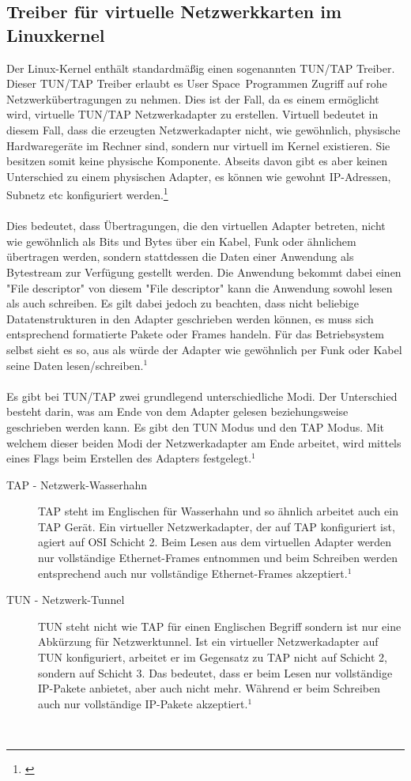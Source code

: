 \subsection{Treiber für virtuelle Netzwerkkarten im Linuxkernel}
Der Linux-Kernel enthält standardmäßig einen sogenannten TUN/TAP Treiber. Dieser TUN/TAP Treiber erlaubt es \dq User Space\dq \ Programmen Zugriff auf rohe Netzwerkübertragungen zu nehmen. Dies ist der Fall, da es einem ermöglicht wird, virtuelle TUN/TAP Netzwerkadapter zu erstellen.
Virtuell bedeutet in diesem Fall, dass die erzeugten Netzwerkadapter nicht, wie gewöhnlich, physische Hardwaregeräte im Rechner sind, sondern nur virtuell im Kernel existieren. Sie besitzen somit keine physische Komponente. Abseits davon gibt es aber keinen Unterschied zu einem physischen Adapter, es können wie gewohnt IP-Adressen, Subnetz etc konfiguriert werden.\footnote[1]{\cite[Vgl.][]{TUNTAP}}
\\\\
Dies bedeutet, dass Übertragungen, die den virtuellen Adapter betreten, nicht wie gewöhnlich als Bits und Bytes über ein Kabel, Funk oder ähnlichem übertragen werden, sondern stattdessen die Daten einer Anwendung als Bytestream zur Verfügung gestellt werden. Die Anwendung bekommt dabei einen "File descriptor" von diesem "File descriptor" kann die Anwendung sowohl lesen als auch schreiben. Es gilt dabei jedoch zu beachten, dass nicht beliebige Datatenstrukturen in den Adapter geschrieben werden können, es muss sich entsprechend formatierte Pakete oder Frames handeln. Für das Betriebsystem selbst sieht es so, aus als würde der Adapter wie gewöhnlich per Funk oder Kabel seine Daten lesen/schreiben.$^{1}$ 
\\\\
Es gibt bei TUN/TAP zwei grundlegend unterschiedliche Modi. Der Unterschied besteht darin, was am Ende von dem Adapter gelesen beziehungsweise geschrieben werden kann. Es gibt den TUN Modus und den TAP Modus. Mit welchem dieser beiden Modi der Netzwerkadapter am Ende arbeitet, wird mittels eines Flags beim Erstellen des Adapters festgelegt.$^{1}$ 
\\
\begin{description}
    \item[TAP - Netzwerk-Wasserhahn] TAP steht im Englischen für Wasserhahn und so ähnlich arbeitet auch ein TAP Gerät.
    Ein virtueller Netzwerkadapter, der auf TAP konfiguriert ist, agiert auf OSI Schicht 2. 
    Beim Lesen aus dem virtuellen Adapter werden nur vollständige Ethernet-Frames entnommen und beim Schreiben werden entsprechend auch nur vollständige Ethernet-Frames akzeptiert.$^{1}$ 
    \\
    \item[TUN - Netzwerk-Tunnel] TUN steht nicht wie TAP für einen Englischen Begriff sondern ist nur eine Abkürzung für Netzwerktunnel. 
    Ist ein virtueller Netzwerkadapter auf TUN konfiguriert, arbeitet er im Gegensatz zu TAP nicht auf Schicht 2, sondern auf Schicht 3. Das bedeutet, dass er beim Lesen nur vollständige IP-Pakete anbietet, aber auch nicht mehr. Während er beim Schreiben auch nur vollständige IP-Pakete akzeptiert.$^{1}$ 
\end{description}
\

